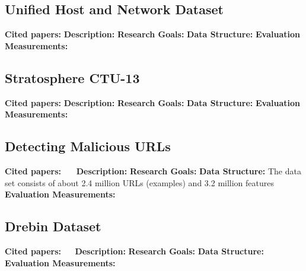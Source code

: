 \subsection{Unified Host and Network Dataset}
\textbf{Cited papers:} \newline
\textbf{Description:} \newline
\textbf{Research Goals:}  \newline
\textbf{Data Structure:} \newline
\textbf{Evaluation Measurements:} \newline

\subsection{Stratosphere CTU-13}
\textbf{Cited papers:} \newline
\textbf{Description:} \newline
\textbf{Research Goals:}  \newline
\textbf{Data Structure:} \newline
\textbf{Evaluation Measurements:} \newline

\subsection{Detecting Malicious URLs}
\textbf{Cited papers:}~\cite{ma2010exploiting}~\cite{ma2009identifying}~\cite{ma2009beyond} \newline
\textbf{Description:} \newline
\textbf{Research Goals:}  \newline
\textbf{Data Structure:} The data set consists of about 2.4 million URLs (examples) and 3.2 million features \newline
\textbf{Evaluation Measurements:} \newline

\subsection{Drebin Dataset}
\textbf{Cited papers:} ~\cite{arp2014drebin}~\cite{torrano2009self}\newline
\textbf{Description:} \newline
\textbf{Research Goals:}  \newline
\textbf{Data Structure:} \newline
\textbf{Evaluation Measurements:} \newline


